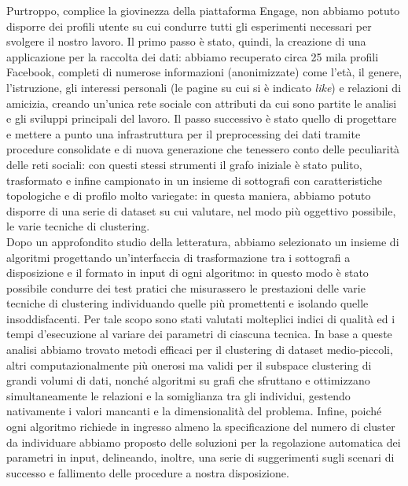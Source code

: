 Purtroppo, complice la giovinezza della piattaforma Engage, non abbiamo potuto disporre dei profili utente su cui condurre tutti gli esperimenti necessari per svolgere il nostro lavoro. Il primo passo \`e stato, quindi, la creazione di una applicazione per la raccolta dei dati: abbiamo recuperato circa 25 mila profili Facebook, completi di numerose informazioni (anonimizzate) come l'et\`a, il genere, l'istruzione, gli interessi personali (le pagine su cui si \`e indicato \textit{like}) e relazioni di amicizia, creando un'unica rete sociale con attributi da cui sono partite le analisi e gli sviluppi principali del lavoro. Il passo successivo \`e stato quello di progettare e mettere a punto una infrastruttura per il preprocessing dei dati tramite procedure consolidate e di nuova generazione che tenessero conto delle peculiarit\`a delle reti sociali: con questi stessi strumenti il grafo iniziale \`e stato pulito, trasformato e infine campionato in un insieme di sottografi con caratteristiche topologiche e di profilo molto variegate: in questa maniera, abbiamo potuto disporre di una serie di dataset su cui valutare, nel modo pi\`u oggettivo possibile, le varie tecniche di clustering. \\
Dopo un approfondito studio della letteratura, abbiamo selezionato un insieme di algoritmi progettando un'interfaccia di trasformazione tra i sottografi a disposizione e il formato in input di ogni algoritmo: in questo modo \`e stato possibile condurre dei test pratici che misurassero le prestazioni delle varie tecniche di clustering individuando quelle pi\`u promettenti e isolando quelle insoddisfacenti. Per tale scopo sono stati valutati molteplici indici di qualit\`a ed i tempi d'esecuzione al variare dei parametri di ciascuna tecnica. In base a queste analisi abbiamo trovato metodi efficaci per il clustering di dataset medio-piccoli, altri computazionalmente pi\`u onerosi ma validi per il subspace clustering di grandi volumi di dati, nonch\'e algoritmi su grafi che sfruttano e ottimizzano simultaneamente le relazioni e la somiglianza tra gli individui, gestendo nativamente i valori mancanti e la dimensionalit\`a del problema. Infine, poich\'e ogni algoritmo richiede in ingresso almeno la specificazione del numero di cluster da individuare abbiamo proposto delle soluzioni per la regolazione automatica dei parametri in input, delineando, inoltre, una serie di suggerimenti sugli scenari di successo e fallimento delle procedure a nostra disposizione. \\ 	

